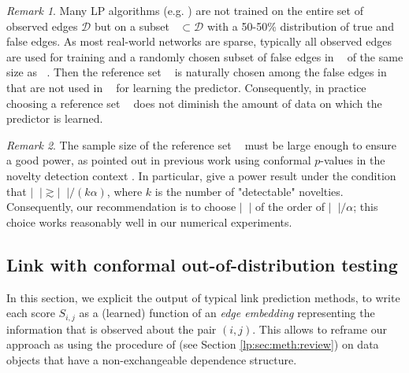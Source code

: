 \documentclass[a4paper, 11pt]{article}
\theoremstyle{remark}
\newtheorem{remark}{Remark}
\DeclareMathOperator{\Dtr}{\cD_{\text{train}}}
\DeclareMathOperator{\Dcal}{\cD_{\text{cal}}}
\DeclareMathOperator{\Dtest}{\cD_{\text{test}}}
\DeclareMathOperator{\cDNull}{\cD^0}
\DeclareMathOperator{\cDAlt}{\cD^1}
\newcommand{\EM}{\ensuremath}
\newcommand{\cD}{\EM{\mathcal{D}}}
\begin{document}
\begin{remark} Many LP algorithms (e.g. \citealp{zhang2018link}) are not trained on the entire set of observed edges $\cD$ but on a subset $\Dtr \subset \cD$ with a 50-50\% distribution of true and false edges. As most real-world networks are sparse, typically all observed edges $\cDAlt$ are used for training and a randomly chosen subset of false edges in $\cDNull$ of the same size as $\cDAlt$. Then the reference set $\Dcal$ is naturally chosen among the false edges in $\cDNull$ that are not used in $\Dtr$ for learning the predictor. Consequently, in practice choosing a reference set $\Dcal$ does not diminish the amount of data on which the predictor is learned. %
\end{remark}


\begin{remark} \label{rem:samplesize}
The sample size of the reference set $\Dcal$ must be large enough to ensure a good power, as pointed out in previous work using conformal $p$-values in the novelty detection context \citep{mary2022semi, marandon22b, yang2021bonus}. In particular, \cite{mary2022semi} give a power result under the condition that $\vert \Dcal \vert \gtrsim \vert \Dtest \vert / (k\alpha)$, where $k$ is the number of "detectable" novelties. Consequently, our recommendation is to choose $\vert \Dcal \vert$ of the order of $\vert \Dtest \vert / \alpha$; this choice works reasonably well in our numerical experiments.
\end{remark}



\subsection{Link with conformal out-of-distribution testing} 
In this section, we explicit the output of typical link prediction methods, to write each score $S_{i,j}$ as a (learned) function of an \textit{edge embedding} representing the information that is observed about the pair $(i,j)$. 
This allows to reframe our approach as using the procedure of \cite{bates2023testing} (see Section \ref{lp:sec:meth:review}) on data objects that have a non-exchangeable dependence structure.  
\end{document}
